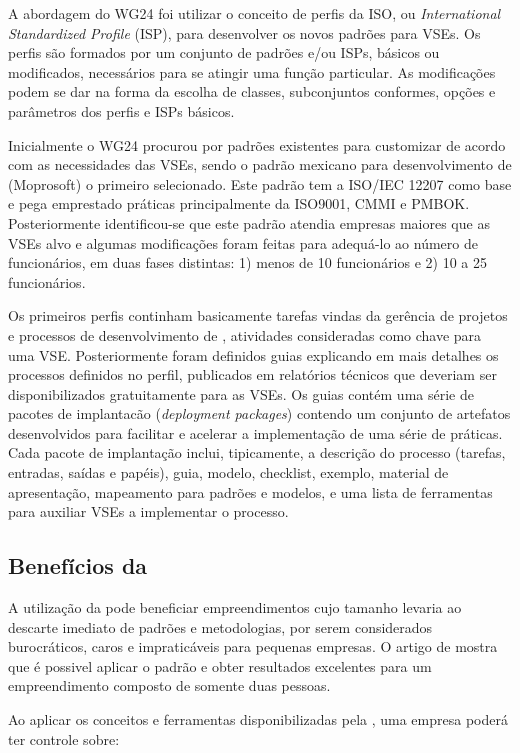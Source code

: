 A abordagem do WG24 foi utilizar o conceito de perfis da ISO, ou \textit{International Standardized Profile} (ISP), para desenvolver os novos padrões para VSEs. Os perfis são formados por um conjunto de padrões e/ou ISPs, básicos ou modificados, necessários para se atingir uma função particular. As modificações podem se dar na forma da escolha de classes, subconjuntos conformes, opções e parâmetros dos perfis e ISPs básicos.

Inicialmente o WG24 procurou por padrões existentes para customizar de acordo com as necessidades das VSEs, sendo o padrão mexicano para desenvolvimento de \sw (Moprosoft) o primeiro selecionado. Este padrão tem a ISO/IEC 12207 como base e pega emprestado práticas principalmente da ISO9001, CMMI e PMBOK. Posteriormente identificou-se que este padrão atendia empresas maiores que as VSEs alvo e algumas modificações foram feitas para adequá-lo ao número de funcionários, em duas fases distintas: 1) menos de 10 funcionários e 2) 10 a 25 funcionários.

Os primeiros perfis continham basicamente tarefas vindas da gerência de projetos e processos de desenvolvimento de \sw, atividades consideradas como chave para uma VSE. Posteriormente foram definidos guias explicando em mais detalhes os processos definidos no perfil, publicados em relatórios técnicos que deveriam ser disponibilizados gratuitamente para as VSEs. Os guias contém uma série de pacotes de implantacão (\textit{deployment packages}) contendo um conjunto de artefatos desenvolvidos para facilitar e acelerar a implementação de uma série de práticas. Cada pacote de implantação inclui, tipicamente, a descrição do processo (tarefas, entradas, saídas e papéis), guia, modelo, checklist, exemplo, material de apresentação, mapeamento para padrões e modelos, e uma lista de ferramentas para auxiliar VSEs a implementar o processo.

\subsection{Benefícios da \iso}

A utilização da \iso pode beneficiar empreendimentos cujo tamanho levaria ao descarte imediato de padrões e metodologias, por serem considerados burocráticos, caros e impraticáveis para pequenas empresas. O artigo de \cite{swicetrip} mostra que é possivel aplicar o padrão e obter resultados excelentes para um empreendimento composto de somente duas pessoas.

Ao aplicar os conceitos e ferramentas disponibilizadas pela \iso, uma empresa poderá ter controle sobre:

